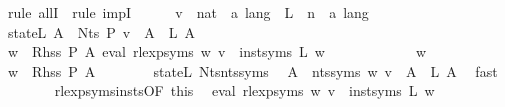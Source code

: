 \begin{isabellebody}
\ {\isacharparenleft}{\kern0pt}rule\ allI\ {\isacharbar}{\kern0pt}\ rule\ impI{\isacharparenright}{\kern0pt}{\isacharplus}{\kern0pt}\isanewline
\ \ \ \ \isamarkupfalse%
\ v\ {\isacharcolon}{\kern0pt}{\isacharcolon}{\kern0pt}\ {\isachardoublequoteopen}nat\ {\isasymRightarrow}\ {\isacharprime}{\kern0pt}a\ lang{\isachardoublequoteclose}\ \ L\ {\isacharcolon}{\kern0pt}{\isacharcolon}{\kern0pt}\ {\isachardoublequoteopen}{\isacharprime}{\kern0pt}n\ {\isasymRightarrow}\ {\isacharprime}{\kern0pt}a\ lang{\isachardoublequoteclose}\isanewline
\ \ \ \ \isamarkupfalse%
\ state{\isacharunderscore}{\kern0pt}L{\isacharcolon}{\kern0pt}\ {\isachardoublequoteopen}{\isasymforall}A\ {\isasymin}\ Nts\ P{\isachardot}{\kern0pt}\ v\ {\isacharparenleft}{\kern0pt}{\isasymgamma}{\isacharprime}{\kern0pt}\ A{\isacharparenright}{\kern0pt}\ {\isacharequal}{\kern0pt}\ L\ A{\isachardoublequoteclose}\isanewline
\ \ \ \ \isamarkupfalse%
\ {\isachardoublequoteopen}{\isasymforall}w\ {\isasymin}\ Rhss\ P\ A{\isachardot}{\kern0pt}\ eval\ {\isacharparenleft}{\kern0pt}rlexp{\isacharunderscore}{\kern0pt}syms\ w{\isacharparenright}{\kern0pt}\ v\ {\isacharequal}{\kern0pt}\ inst{\isacharunderscore}{\kern0pt}syms\ L\ w{\isachardoublequoteclose}\isanewline
\ \ \ \ \isamarkupfalse%
\isanewline
\ \ \ \ \ \ \isamarkupfalse%
\ w\isanewline
\ \ \ \ \ \ \isamarkupfalse%
\ {\isachardoublequoteopen}w\ {\isasymin}\ Rhss\ P\ A{\isachardoublequoteclose}\isanewline
\ \ \ \ \ \ \isamarkupfalse%
\ state{\isacharunderscore}{\kern0pt}L\ Nts{\isacharunderscore}{\kern0pt}nts{\isacharunderscore}{\kern0pt}syms\ \isamarkupfalse%
\ {\isachardoublequoteopen}{\isasymforall}A\ {\isasymin}\ nts{\isacharunderscore}{\kern0pt}syms\ w{\isachardot}{\kern0pt}\ v\ {\isacharparenleft}{\kern0pt}{\isasymgamma}{\isacharprime}{\kern0pt}\ A{\isacharparenright}{\kern0pt}\ {\isacharequal}{\kern0pt}\ L\ A{\isachardoublequoteclose}\ \isamarkupfalse%
\ fast\isanewline
\ \ \ \ \ \ \isamarkupfalse%
\ rlexp{\isacharunderscore}{\kern0pt}syms{\isacharunderscore}{\kern0pt}insts{\isacharbrackleft}{\kern0pt}OF\ this{\isacharbrackright}{\kern0pt}\ \isamarkupfalse%
\ {\isachardoublequoteopen}eval\ {\isacharparenleft}{\kern0pt}rlexp{\isacharunderscore}{\kern0pt}syms\ w{\isacharparenright}{\kern0pt}\ v\ {\isacharequal}{\kern0pt}\ inst{\isacharunderscore}{\kern0pt}syms\ L\ w{\isachardoublequoteclose}\ \isamarkupfalse%

\end{isabellebody}
